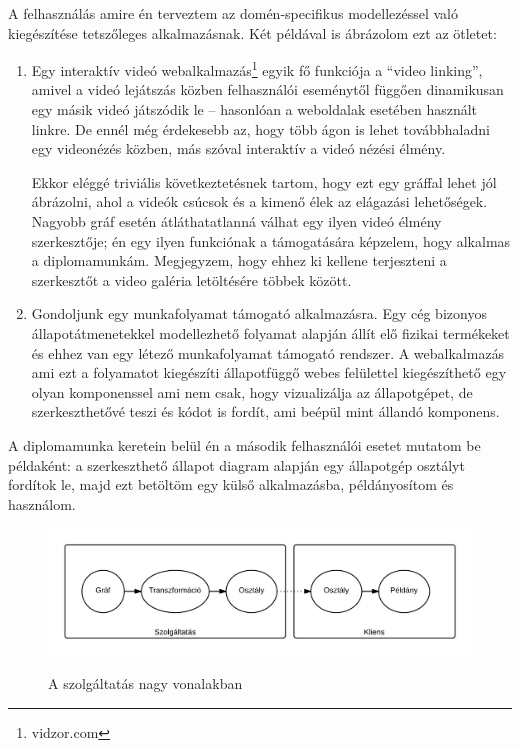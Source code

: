 A felhasználás amire én terveztem az domén-specifikus modellezéssel való kiegészítése tetszőleges alkalmazásnak. Két példával is ábrázolom ezt az ötletet:
\begin{enumerate}
\item Egy interaktív videó webalkalmazás\footnote{vidzor.com} egyik fő funkciója a ``video linking'', amivel a videó lejátszás közben felhasználói eseménytől függően dinamikusan egy másik videó játszódik le -- hasonlóan a weboldalak esetében használt linkre. De ennél még érdekesebb az, hogy több ágon is lehet továbbhaladni egy videonézés közben, más szóval interaktív a videó nézési élmény. 

Ekkor eléggé triviális következtetésnek tartom, hogy ezt egy gráffal lehet jól ábrázolni, ahol a videók csúcsok és a kimenő élek az elágazási lehetőségek. Nagyobb gráf esetén átláthatatlanná válhat egy ilyen videó élmény szerkesztője; én egy ilyen funkciónak a támogatására képzelem, hogy alkalmas a diplomamunkám. Megjegyzem, hogy ehhez ki kellene terjeszteni a szerkesztőt a video galéria letöltésére többek között. 
\item Gondoljunk egy munkafolyamat támogató alkalmazásra. Egy cég bizonyos állapotátmenetekkel modellezhető folyamat alapján állít elő fizikai termékeket és ehhez van egy létező munkafolyamat támogató rendszer. A webalkalmazás ami ezt a folyamatot kiegészíti állapotfüggő webes felülettel kiegészíthető egy olyan komponenssel ami nem csak, hogy vizualizálja az állapotgépet, de szerkeszthetővé teszi és kódot is fordít, ami beépül mint állandó komponens. 

\end{enumerate}

A diplomamunka keretein belül én a második felhasználói esetet mutatom be példaként: a szerkeszthető állapot diagram alapján egy állapotgép osztályt fordítok le, majd ezt betöltöm egy külső alkalmazásba, példányosítom és használom.

\begin{figure}[!ht]
\centering
\includegraphics[width=\textwidth,height=\textheight,keepaspectratio]{figures/flow.png}\\
\caption{A szolgáltatás nagy vonalakban}
\label{fig:flow}
\end{figure}

